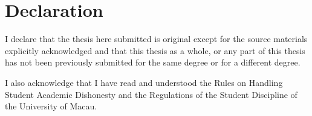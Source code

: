 \section*{\hfill \normalsize{Declaration} \hfill}
{}

\noindent I declare that the thesis here submitted is original except for the source materials explicitly acknowledged and that this thesis as a whole, or any part of this thesis has not been previously submitted for the same degree or for a different degree.

\vspace*{24pt}

\noindent I also acknowledge that I have read and understood the Rules on Handling Student Academic Dishonesty and the Regulations of the Student Discipline of the University of Macau.



